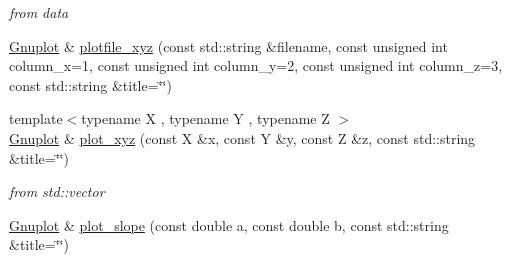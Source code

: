 \begin{DoxyCompactItemize}
\begin{DoxyCompactList}\small\item\em from data \item\end{DoxyCompactList}\item 
\hyperlink{class_gnuplot}{Gnuplot} \& \hyperlink{class_gnuplot_a9dbde2a91eb816481657f3a22c9b0046}{plotfile\_\-xyz} (const std::string \&filename, const unsigned int column\_\-x=1, const unsigned int column\_\-y=2, const unsigned int column\_\-z=3, const std::string \&title=\char`\"{}\char`\"{})
\item 
\hypertarget{class_gnuplot_a3e97777ee0695e5aa6b038054bd781d2}{
{\footnotesize template$<$typename X , typename Y , typename Z $>$ }\\\hyperlink{class_gnuplot}{Gnuplot} \& \hyperlink{class_gnuplot_a3e97777ee0695e5aa6b038054bd781d2}{plot\_\-xyz} (const X \&x, const Y \&y, const Z \&z, const std::string \&title=\char`\"{}\char`\"{})}
\label{class_gnuplot_a3e97777ee0695e5aa6b038054bd781d2}

\begin{DoxyCompactList}\small\item\em from std::vector \item\end{DoxyCompactList}\item 
\hypertarget{class_gnuplot_a51ea5105eb87285820bb93910f8d346c}{
\hyperlink{class_gnuplot}{Gnuplot} \& \hyperlink{class_gnuplot_a51ea5105eb87285820bb93910f8d346c}{plot\_\-slope} (const double a, const double b, const std::string \&title=\char`\"{}\char`\"{})}
\label{class_gnuplot_a51ea5105eb87285820bb93910f8d346c}


\end{DoxyCompactItemize}
